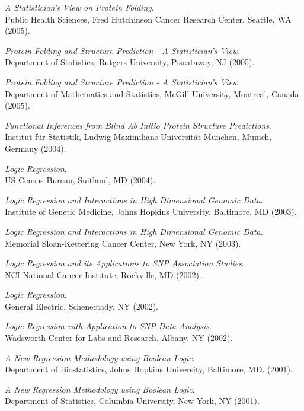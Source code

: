 \documentclass[10pt]{article}
\begin{document}
\item
{\it A Statistician's View on Protein Folding}.\\
Public Health Sciences, Fred Hutchinson Cancer Research Center, Seattle, WA
(2005).
\item
{\it Protein Folding and Structure Prediction - A Statistician's View}.\\
Department of Statistics, Rutgers University, Piscataway, NJ
(2005).
\item
{\it Protein Folding and Structure Prediction - A Statistician's View}.\\
Department of Mathematics and Statistics, McGill University, Montreal, Canada
(2005).  
\item
{\it Functional Inferences from Blind Ab Initio Protein Structure Predictions}.\\
Institut f\"ur Statistik, Ludwig-Maximilians Universit\"at M\"unchen, Munich, Germany
(2004).
\item
{\it Logic Regression}.\\
US Census Bureau, Suitland, MD
(2004).
\item
{\it Logic Regression and Interactions in High Dimensional Genomic Data}.\\
Institute of Genetic Medicine, Johns Hopkins University, Baltimore, MD
(2003).
\item
{\it Logic Regression and Interactions in High Dimensional Genomic Data}.\\
Memorial Sloan-Kettering Cancer Center, New York, NY
(2003).  
\item
{\it Logic Regression and its Applications to SNP Association Studies}.\\
NCI National Cancer Institute, Rockville, MD
(2002).
\item
{\it Logic Regression}.\\
General Electric, Schenectady, NY
(2002).
\item
{\it Logic Regression with Application to SNP Data Analysis}.\\
Wadsworth Center for Labs and Research, Albany, NY
(2002).
\item
{\it A New Regression Methodology using Boolean Logic}.\\
Department of Biostatistics, Johns Hopkins University, Baltimore, MD.
(2001).
\item
{\it A New Regression Methodology using Boolean Logic}.\\
Department of Statistics, Columbia University, New York, NY
(2001).
\end{document}
